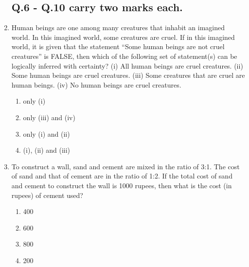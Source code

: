 \documentclass{article}
\begin{document}
\begin{enumerate}[leftmargin=*]
\subsection*{Q.6 - Q.10 carry two marks each.}

\item Human beings are one among many creatures that inhabit an imagined world. In this imagined world, some creatures are cruel. If in this imagined world, it is given that the statement ``Some human beings are not cruel creatures'' is FALSE, then which of the following set of statement(s) can be logically inferred with certainty? 
(i) All human beings are cruel creatures.
(ii) Some human beings are cruel creatures.
(iii) Some creatures that are cruel are human beings.
(iv) No human beings are cruel creatures.
\begin{multicols}{4}
\begin{enumerate}
\item only (i)
\item only (iii) and (iv)
\item only (i) and (ii)
\item (i), (ii) and (iii)
\end{enumerate}
\end{multicols}

\item To construct a wall, sand and cement are mixed in the ratio of 3:1. The cost of sand and that of cement are in the ratio of 1:2. If the total cost of sand and cement to construct the wall is 1000 rupees, then what is the cost (in rupees) of cement used?
\begin{multicols}{4}
\begin{enumerate}
\item 400
\item 600
\item 800
\item 200
\end{enumerate}
\end{multicols}


\end{enumerate}
\end{document}
